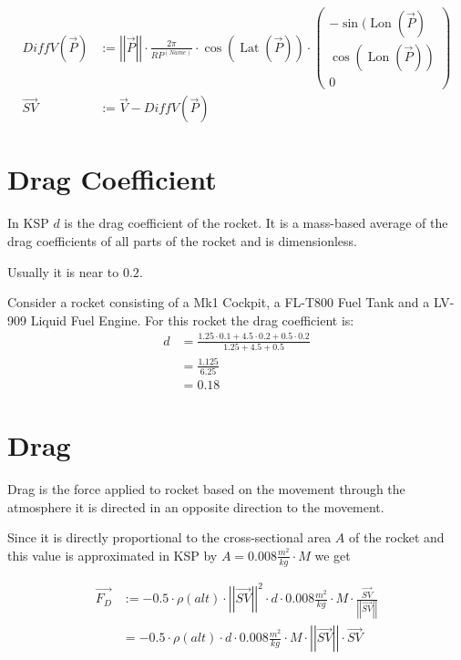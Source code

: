 \documentclass[11pt]{article}
\newcommand{\oa}[1]{\overrightarrow{#1}}
\newcommand{\F}[1]{\oa{F_{#1}}}
\newcommand{\Pos}{\oa{P}}
\newcommand{\Vel}{\oa{V}}
\newcommand{\absvec}[1]{\left|\left|{#1}\right|\right|}
\DeclareMathOperator{\Lat}{Lat}
\DeclareMathOperator{\Lon}{Lon}
\begin{document}
\begin{align}
  DiffV(\Pos) &:= \absvec{\Pos} \cdot \frac{2 \pi}{RP^{(Name)}} \cdot \cos\left(\Lat\left(\Pos\right)\right)\cdot\left(\begin{smallmatrix}-\sin(\Lon(\Pos)\\\cos(\Lon(\Pos))\\0\end{smallmatrix}\right)\\
  \oa{SV} &:= \Vel - DiffV(\Pos)
\end{align}

\section{Drag Coefficient}

In KSP $d$ is the drag coefficient of the rocket. It is a mass-based
average of the drag coefficients of all parts of the rocket and is
dimensionless.

Usually it is near to $0.2$.

Consider a rocket consisting of a Mk1 Cockpit, a FL-T800 Fuel Tank and
a LV-909 Liquid Fuel Engine. For this rocket the drag coefficient is:
\begin{align}
  d &= \frac{1.25 \cdot 0.1 + 4.5 \cdot 0.2 + 0.5 \cdot 0.2}{ 1.25 + 4.5 + 0.5 }\nonumber\\
  &= \frac{1.125}{6.25}\nonumber\\
  &= 0.18\nonumber
\end{align}

\section{Drag}

Drag is the force applied to rocket based on the movement through the
atmosphere it is directed in an opposite direction to the movement.

Since it is directly proportional to the cross-sectional area $A$ of
the rocket and this value is approximated in KSP by $A = 0.008
\frac{m^2}{kg} \cdot M$ we get

\begin{align}
  \F{D} &:= - 0.5 \cdot \rho(alt)\cdot \absvec{\oa{SV}}^2\cdot d \cdot 0.008\frac{m^2}{kg} \cdot M \cdot \frac{\oa{SV}}{\absvec{\oa{SV}}} \nonumber\\
  &= - 0.5 \cdot \rho(alt)\cdot d \cdot 0.008\frac{m^2}{kg} \cdot M \cdot \absvec{\oa{SV}} \cdot \oa{SV}
\end{align}
\end{document}
